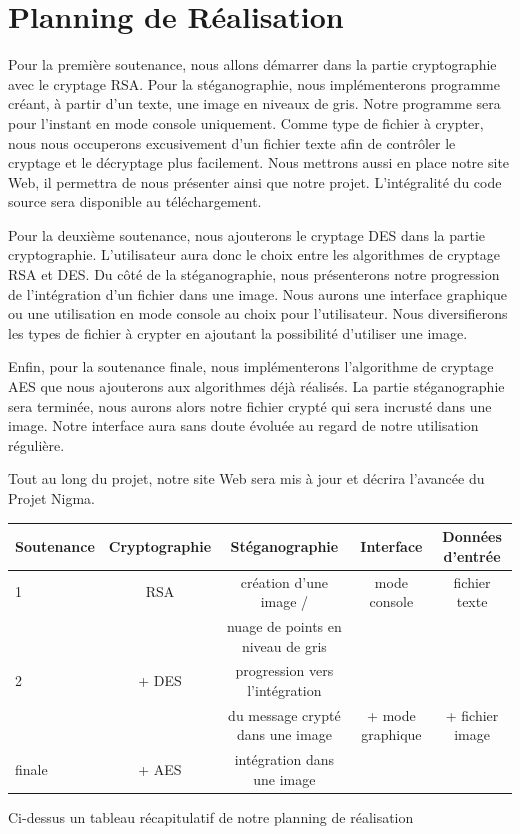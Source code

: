 \documentclass[a4paper,12pt]{article}
\begin{document}
\newpage

\part{Planning de Réalisation}
Pour la première soutenance, nous allons démarrer dans la partie cryptographie avec le cryptage RSA. Pour la stéganographie, nous implémenterons programme créant, à partir d'un texte, une image en niveaux de gris. Notre programme sera pour l'instant en mode console uniquement. Comme type de fichier à crypter, nous nous occuperons excusivement d'un fichier texte afin de contrôler le cryptage et le décryptage plus facilement. Nous mettrons aussi en place notre site Web, il permettra de nous présenter ainsi que notre projet. L'intégralité du code source sera disponible au téléchargement.

Pour la deuxième soutenance, nous ajouterons le cryptage DES dans la partie cryptographie. L'utilisateur aura donc le choix entre les algorithmes de cryptage RSA et DES. Du côté de la stéganographie, nous présenterons notre progression de l'intégration d'un fichier dans une image. Nous aurons une interface graphique ou une utilisation en mode console au choix pour l'utilisateur. Nous diversifierons les types de fichier à crypter en ajoutant la possibilité d'utiliser une image.

Enfin, pour la soutenance finale, nous implémenterons l'algorithme de cryptage AES que nous ajouterons aux algorithmes déjà réalisés. La partie stéganographie sera terminée, nous aurons alors notre fichier crypté qui sera incrusté dans une image. Notre interface aura sans doute évoluée au regard de notre utilisation régulière.

Tout au long du projet, notre site Web sera mis à jour et décrira l'avancée du Projet Nigma.

\bigskip
\begin{landscape}

\begin{tabular}{|l|c|c|c|c|}
  \hline
  Soutenance & Cryptographie & Stéganographie                    & Interface        & Données d'entrée \\ \hline \hline
  1          & RSA           & création d'une image /            & mode console     & fichier texte    \\
  &               & nuage de points en niveau de gris &                  &                  \\ \hline
  2          & + DES         & progression vers l'intégration    &                  &                  \\
  &               & du message crypté dans une image  & + mode graphique & + fichier image  \\ \hline
  finale     & + AES         & intégration dans une image        &                  &                  \\ \hline
\end{tabular}
\begin{center}
Ci-dessus un tableau récapitulatif de notre planning de réalisation
\end{center}
\end{landscape}
\newpage
\end{document}
